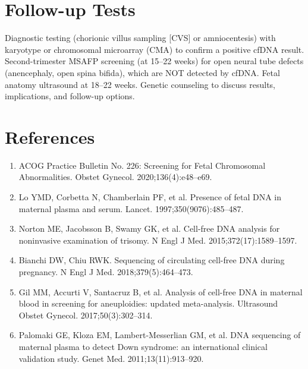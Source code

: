 \section*{Follow-up Tests}
Diagnostic testing (chorionic villus sampling [CVS] or amniocentesis) with karyotype or chromosomal microarray (CMA) to confirm a positive cfDNA result. Second-trimester MSAFP screening (at 15--22 weeks) for open neural tube defects (anencephaly, open spina bifida), which are NOT detected by cfDNA. Fetal anatomy ultrasound at 18--22 weeks. Genetic counseling to discuss results, implications, and follow-up options.

\section*{References}
\begin{enumerate}
  \item ACOG Practice Bulletin No. 226: Screening for Fetal Chromosomal Abnormalities. Obstet Gynecol. 2020;136(4):e48--e69.
  \item Lo YMD, Corbetta N, Chamberlain PF, et al. Presence of fetal DNA in maternal plasma and serum. Lancet. 1997;350(9076):485--487.
  \item Norton ME, Jacobsson B, Swamy GK, et al. Cell-free DNA analysis for noninvasive examination of trisomy. N Engl J Med. 2015;372(17):1589--1597.
  \item Bianchi DW, Chiu RWK. Sequencing of circulating cell-free DNA during pregnancy. N Engl J Med. 2018;379(5):464--473.
  \item Gil MM, Accurti V, Santacruz B, et al. Analysis of cell-free DNA in maternal blood in screening for aneuploidies: updated meta-analysis. Ultrasound Obstet Gynecol. 2017;50(3):302--314.
  \item Palomaki GE, Kloza EM, Lambert-Messerlian GM, et al. DNA sequencing of maternal plasma to detect Down syndrome: an international clinical validation study. Genet Med. 2011;13(11):913--920.
\end{enumerate}

\clearpage
